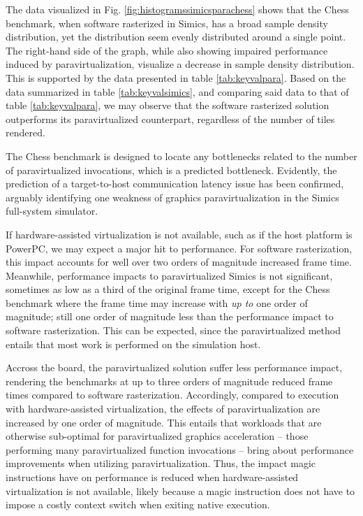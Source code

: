 The data visualized in Fig. \ref{fig:histogramssimicsparachess} shows that the Chess benchmark, when software rasterized in Simics, has a broad sample density distribution, yet the distribution seem evenly distributed around a single point.
The right-hand side of the graph, while also showing impaired performance induced by paravirtualization, visualize a decrease in sample density distribution.
This is supported by the data presented in table \ref{tab:keyvalpara}.
Based on the data summarized in table \ref{tab:keyvalsimics}, and comparing said data to that of table \ref{tab:keyvalpara}, we may observe that the software rasterized solution outperforms its paravirtualized counterpart, regardless of the number of tiles rendered.

The Chess benchmark is designed to locate any bottlenecks related to the number of paravirtualized invocations, which is a predicted bottleneck.
Evidently, the prediction of a target-to-host communication latency issue has been confirmed, arguably identifying one weakness of graphics paravirtualization in the Simics full-system simulator.

If hardware-assisted virtualization is not available, such as if the host platform is PowerPC, we may expect a major hit to performance.
For software rasterization, this impact accounts for well over two orders of magnitude increased frame time.
Meanwhile, performance impacts to paravirtualized Simics is not significant, sometimes as low as a third of the original frame time, except for the Chess benchmark where the frame time may increase with \textit{up to} one order of magnitude; still one order of magnitude less than the performance impact to software rasterization.
This can be expected, since the paravirtualized method entails that most work is performed on the simulation host.

Accross the board, the paravirtualized solution suffer less performance impact, rendering the benchmarks at up to three orders of magnitude reduced frame times compared to software rasterization.
Accordingly, compared to execution with hardware-assisted virtualization, the effects of paravirtualization are increased by one order of magnitude.
This entails that workloads that are otherwise sub-optimal for paravirtualized graphics acceleration -- those performing many paravirtualized function invocations -- bring about performance improvements when utilizing paravirtualization.
Thus, the impact magic instructions have on performance is reduced when hardware-assisted virtualization is not available, likely because a magic instruction does not have to impose a costly context switch when exiting native execution.

